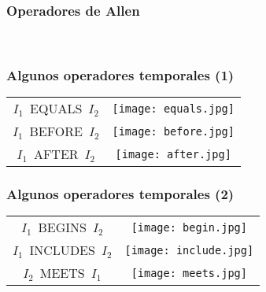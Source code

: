 \documentclass[12pt]{beamer}
\begin{document}
\begin{frame}
\frametitle{Operadores de Allen}
\ \\
\end{frame}

\begin{frame}
\frametitle{Algunos operadores temporales (1)}
\begin{center}
\begin{tabular}{cc}
$I_{1}$\ EQUALS\ $I_{2}$ & \texttt{[image: equals.jpg]}\\
$I_{1}$\ BEFORE\ $I_{2}$ & \texttt{[image: before.jpg]}\\
$I_{1}$\ AFTER\ $I_{2}$ & \texttt{[image: after.jpg]}\\
\end{tabular}
\end{center}
\end{frame}

\begin{frame}
\frametitle{Algunos operadores temporales (2)}
\begin{center}
\begin{tabular}{cc}
$I_{1}$\ BEGINS\ $I_{2}$ & \texttt{[image: begin.jpg]}\\
$I_{1}$\ INCLUDES\ $I_{2}$ & \texttt{[image: include.jpg]}\\
$I_{2}$\ MEETS\ $I_{1}$ & \texttt{[image: meets.jpg]}\\
\end{tabular}
\end{center}
\end{frame}
\end{document}
